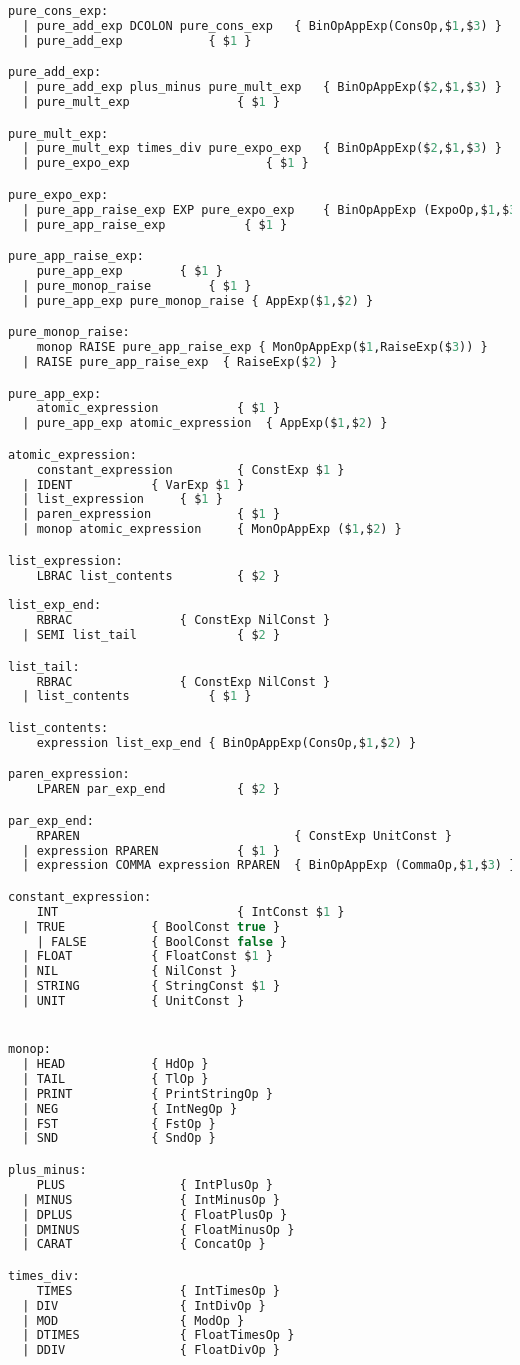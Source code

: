 \begin{lstlisting}[language=Caml, caption=tailRecPicoMLparse.mly]
pure_cons_exp:
  | pure_add_exp DCOLON pure_cons_exp   { BinOpAppExp(ConsOp,$1,$3) }
  | pure_add_exp			{ $1 }

pure_add_exp:
  | pure_add_exp plus_minus pure_mult_exp	{ BinOpAppExp($2,$1,$3) }
  | pure_mult_exp				{ $1 }

pure_mult_exp:
  | pure_mult_exp times_div pure_expo_exp 	{ BinOpAppExp($2,$1,$3) }
  | pure_expo_exp	       			{ $1 }

pure_expo_exp:
  | pure_app_raise_exp EXP pure_expo_exp	{ BinOpAppExp (ExpoOp,$1,$3) }
  | pure_app_raise_exp           { $1 }

pure_app_raise_exp:
    pure_app_exp		{ $1 }
  | pure_monop_raise 		{ $1 }
  | pure_app_exp pure_monop_raise { AppExp($1,$2) }

pure_monop_raise:
    monop RAISE pure_app_raise_exp { MonOpAppExp($1,RaiseExp($3)) }
  | RAISE pure_app_raise_exp  { RaiseExp($2) }

pure_app_exp:
    atomic_expression			{ $1 }
  | pure_app_exp atomic_expression 	{ AppExp($1,$2) }

atomic_expression:
    constant_expression         { ConstExp $1 }
  | IDENT			{ VarExp $1 }
  | list_expression		{ $1 }
  | paren_expression            { $1 }
  | monop atomic_expression		{ MonOpAppExp ($1,$2) }

list_expression:
    LBRAC list_contents			{ $2 }
 
list_exp_end:
    RBRAC				{ ConstExp NilConst }
  | SEMI list_tail				{ $2 }

list_tail:
    RBRAC				{ ConstExp NilConst }
  | list_contents			{ $1 }

list_contents:
    expression list_exp_end	{ BinOpAppExp(ConsOp,$1,$2) }

paren_expression:
    LPAREN par_exp_end			{ $2 }

par_exp_end:
    RPAREN								{ ConstExp UnitConst }
  | expression RPAREN			{ $1 }
  | expression COMMA expression RPAREN	{ BinOpAppExp (CommaOp,$1,$3) }

constant_expression:
    INT                         { IntConst $1 }
  | TRUE			{ BoolConst true }
	| FALSE			{ BoolConst false }
  | FLOAT			{ FloatConst $1 }
  | NIL	  			{ NilConst }
  | STRING			{ StringConst $1 }
  | UNIT			{ UnitConst }


monop:
  | HEAD			{ HdOp }
  | TAIL			{ TlOp }
  | PRINT			{ PrintStringOp }
  | NEG				{ IntNegOp }
  | FST				{ FstOp }
  | SND				{ SndOp }

plus_minus:
    PLUS				{ IntPlusOp }
  | MINUS				{ IntMinusOp }
  | DPLUS				{ FloatPlusOp }
  | DMINUS				{ FloatMinusOp }
  | CARAT				{ ConcatOp }

times_div:
    TIMES				{ IntTimesOp }
  | DIV					{ IntDivOp }
  | MOD					{ ModOp }
  | DTIMES				{ FloatTimesOp }
  | DDIV				{ FloatDivOp }
\end{lstlisting}